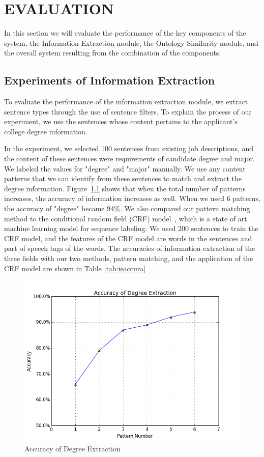 \chapter{EVALUATION}

In this section we will evaluate the performance of the key components of the system, the Information Extraction module, the Ontology Similarity module, and the overall system resulting from the combination of the components.

\section{Experiments of Information Extraction }

To evaluate the performance of the information extraction module, we extract sentence types through the use of sentence filters. To explain the process of our experiment, we use the sentences whose content pertains to the applicant's college degree information.

In the experiment, we selected 100 sentences from existing job descriptions, and the content of these sentences were requirements of candidate degree and major. We labeled the values for "degree" and "major" manually. We use any content patterns that we can identify from these sentences to match and extract the degree information. Figure~\ref{fig:degree_accuracy} shows that when the total number of patterns increases, the accuracy of information increases as well. When we used 6 patterns, the accuracy of "degree" became 94\%. We also compared our pattern matching method to the conditional random field (CRF) model~\cite{lafferty2001conditional}, which is a state of art machine learning model for sequence labeling. We used 200 sentences to train the CRF model, and the features of the CRF model are words in the sentences and part of speech tags of the words. The accuracies of information extraction of the three fields with our two methods, pattern matching, and the application of the CRF model are shown in Table \ref{tab:ieaccura}

\begin{figure}[htbp]
  \centering
  \includegraphics[scale=0.5]{images/degree_accuracy.png}
  \caption{Accuracy of Degree Extraction  }
  \label{fig:degree_accuracy}
\end{figure}


